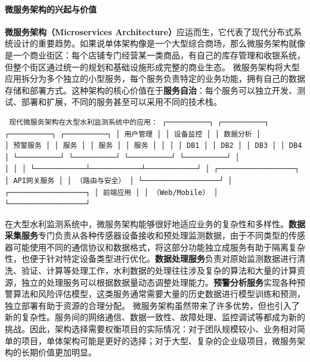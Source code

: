 \paragraph{微服务架构的兴起与价值}\label{ux5faeux670dux52a1ux67b6ux6784ux7684ux5174ux8d77ux4e0eux4ef7ux503c}
\textbf{微服务架构（Microservices
Architecture）}应运而生，它代表了现代分布式系统设计的重要趋势。如果说单体架构像是一个大型综合商场，那么微服务架构就像是一个商业街区：每个店铺专门经营某一类商品，有自己的库存管理和收银系统，但整个街区通过统一的规划和基础设施形成完整的商业生态。
微服务架构将大型应用拆分为多个独立的小型服务，每个服务负责特定的业务功能，拥有自己的数据存储和部署方式。这种架构的核心价值在于\textbf{服务自治}：每个服务可以独立开发、测试、部署和扩展，不同的服务甚至可以采用不同的技术栈。
\begin{lstlisting} 现代微服务架构在大型水利监测系统中的应用： ┌──────────┐ ┌──────────┐ ┌──────────┐ ┌──────────┐ │ 用户管理 │ │ 设备监控 │ │ 数据分析 │
│ 预警服务 │ │ 服务 │ │ 服务 │ │ 服务 │ │ │ │ DB1 │ │ DB2 │ │ DB3 │ │ DB4 │ └──────────┘ └──────────┘ └──────────┘ └──────────┘ │
│ │ │ └────────────┴────────────┴────────────┘ │ ┌──────────────────┐ │ API网关服务 │ │ （路由与安全） │ └──────────────────┘ │
┌──────────────────┐ │ 前端应用 │ │ （Web/Mobile） │ └──────────────────┘ \end{lstlisting}
在大型水利监测系统中，微服务架构能够很好地适应业务的复杂性和多样性。\textbf{数据采集服务}专门负责从各种传感器设备接收和预处理监测数据，由于不同类型的传感器可能使用不同的通信协议和数据格式，将这部分功能独立成服务有助于隔离复杂性，也便于针对特定设备类型进行优化。\textbf{数据处理服务}负责对原始监测数据进行清洗、验证、计算等处理工作，水利数据的处理往往涉及复杂的算法和大量的计算资源，独立的处理服务可以根据数据量动态调整处理能力。\textbf{预警分析服务}实现各种预警算法和风险评估模型，这类服务通常需要大量的历史数据进行模型训练和预测，独立部署有助于资源的合理分配。
微服务架构虽然带来了许多优势，但也引入了新的复杂性。服务间的网络通信、数据一致性、故障处理、监控调试等都成为新的挑战。因此，架构选择需要权衡项目的实际情况：对于团队规模较小、业务相对简单的项目，单体架构可能是更好的选择；对于大型、复杂的企业级项目，微服务架构的长期价值更加明显。
